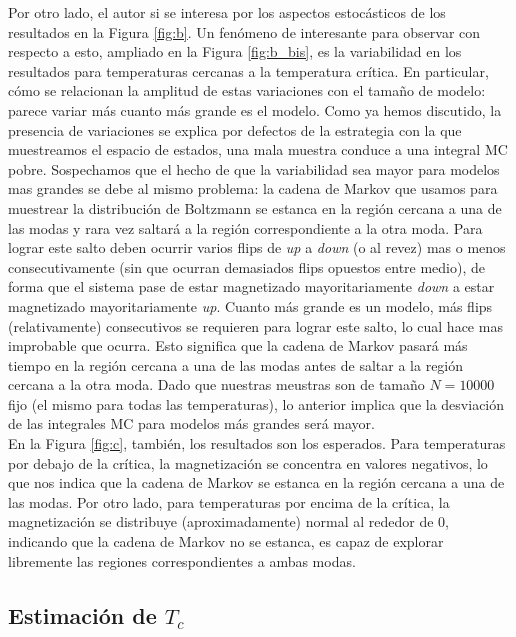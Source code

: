 \documentclass[a4paper,12pt]{article}
\begin{document}
Por otro lado, el autor si se interesa por los aspectos estocásticos de los resultados en la Figura \ref{fig:b}. Un fenómeno de interesante para observar con respecto a esto, ampliado en la Figura \ref{fig:b_bis}, es la variabilidad en los resultados para temperaturas cercanas a la temperatura crítica. En particular, cómo se relacionan la amplitud de estas variaciones con el tamaño de modelo: parece variar más cuanto más grande es el modelo. Como ya hemos discutido, la presencia de variaciones se explica por defectos de la estrategia con la que muestreamos el espacio de estados, una mala muestra conduce a una integral MC pobre. Sospechamos que el hecho de que la variabilidad sea mayor para modelos mas grandes se debe al mismo problema: la cadena de Markov que usamos para muestrear la distribución de Boltzmann se estanca en la región cercana a una de las modas y rara vez saltará a la región correspondiente a la otra moda. Para lograr este salto deben ocurrir varios flips de {\it up} a {\it down} (o al revez) mas o menos consecutivamente (sin que ocurran demasiados flips opuestos entre medio), de forma que el sistema pase de estar magnetizado mayoritariamente {\it down} a estar magnetizado mayoritariamente {\it up}. Cuanto más grande es un modelo, más flips (relativamente) consecutivos se requieren para lograr este salto, lo cual hace mas improbable que ocurra. Esto significa que la cadena de Markov pasará más tiempo en la región cercana a una de las modas antes de saltar a la región cercana a la otra moda. Dado que nuestras meustras son de tamaño $N = 10000$ fijo (el mismo para todas las temperaturas), lo anterior implica que la desviación de las integrales MC para modelos más grandes será mayor.\\

En la Figura \ref{fig:c}, también, los resultados son los esperados. Para temperaturas por debajo de la crítica, la magnetización se concentra en valores negativos, lo que nos indica que la cadena de Markov se estanca en la región cercana a una de las modas. Por otro lado, para temperaturas por encima de la crítica, la magnetización se distribuye (aproximadamente) normal al rededor de 0, indicando que la cadena de Markov no se estanca, es capaz de explorar libremente las regiones correspondientes a ambas modas.

\subsection{Estimación de $T_c$}
\end{document}
